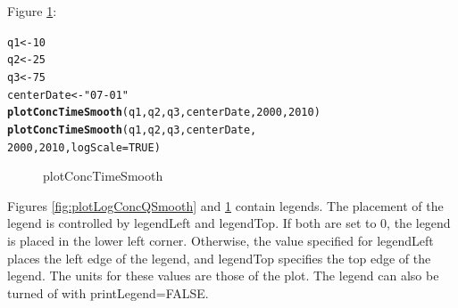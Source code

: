 \documentclass[a4paper,11pt]{article}\usepackage{graphicx, color}
\makeatletter
\newcommand{\hlfunctioncall}[1]{\textcolor[rgb]{0.501960784313725,0,0.329411764705882}{\textbf{#1}}}%
\newcommand{\hlstring}[1]{\textcolor[rgb]{0.6,0.6,1}{#1}}%
\newenvironment{kframe}{%
 \def\at@end@of@kframe{}%
 \ifinner\ifhmode%
  \def\at@end@of@kframe{\end{minipage}}%
  \begin{minipage}{\columnwidth}%
 \fi\fi%
 \def\FrameCommand##1{\hskip\@totalleftmargin \hskip-\fboxsep
 \colorbox{shadecolor}{##1}\hskip-\fboxsep
     \hskip-\linewidth \hskip-\@totalleftmargin \hskip\columnwidth}%
 \MakeFramed {\advance\hsize-\width
   \@totalleftmargin\z@ \linewidth\hsize
   \@setminipage}}%
 {\par\unskip\endMakeFramed%
 \at@end@of@kframe}
\newenvironment{knitrout}{}{} %
\makeatother
\begin{document}
Figure \ref{fig:plotConcTimeSmooth}:
\begin{knitrout}
\color{fgcolor}\begin{kframe}
\begin{alltt}
q1 <- 10
q2 <- 25
q3 <- 75
centerDate <- \hlstring{"07-01"}
\hlfunctioncall{plotConcTimeSmooth}(q1, q2, q3, centerDate, 2000, 2010)
\hlfunctioncall{plotConcTimeSmooth}(q1, q2, q3, centerDate, 
                   2000, 2010,logScale=TRUE)
\end{alltt}
\end{kframe}\begin{figure}[]
\caption[plotConcTimeSmooth]{plotConcTimeSmooth\label{fig:plotConcTimeSmooth}}
\end{figure}


\end{knitrout}


Figures \ref{fig:plotLogConcQSmooth} and \ref{fig:plotConcTimeSmooth} contain legends. The placement of the legend is controlled by legendLeft and legendTop. If both are set to 0, the legend is placed in the lower left corner. Otherwise, the value specified for legendLeft places the left edge of the legend, and legendTop specifies the top edge of the legend. The units for these values are those of the plot. The legend can also be turned of with printLegend=FALSE.
\end{document}
